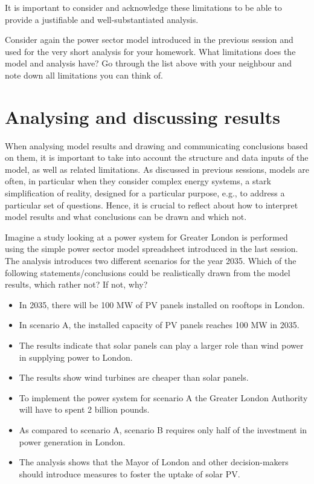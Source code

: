 It is important to consider and acknowledge these limitations to be able to provide a justifiable and well-substantiated analysis.


\begin{kaobox}[frametitle=Task]
Consider again the power sector model introduced in the previous session and used for the very short analysis for your homework. What limitations does the model and analysis have? Go through the list above with your neighbour and note down all limitations you can think of.
\end{kaobox}

\section{Analysing and discussing results}
When analysing model results and drawing and communicating conclusions based on them, it is important to take into account the structure and data inputs of the model, as well as related limitations. As discussed in previous sessions, models are often, in particular when they consider complex energy systems, a stark simplification of reality, designed for a particular purpose, e.g., to address a particular set of questions. Hence, it is crucial to reflect about how to interpret model results and what conclusions can be drawn and which not.


\begin{kaobox}[frametitle=Task]
Imagine a study looking at a power system for Greater London is performed using the simple power sector model spreadsheet introduced in the last session. The analysis introduces two different scenarios for the year 2035. Which of the following statements/conclusions could be realistically drawn from the model results, which rather not? If not, why?

\begin{itemize}
\item In 2035, there will be 100 MW of PV panels installed on rooftops in London.
\item In scenario A, the installed capacity of PV panels reaches 100 MW in 2035.

\item The results indicate that solar panels can play a larger role than wind power in supplying power to London.
\item The results show wind turbines are cheaper than solar panels.

\item To implement the power system for scenario A the Greater London Authority will have to spent 2 billion pounds.
\item As compared to scenario A, scenario B requires only half of the investment in power generation in London.

\item The analysis shows that the Mayor of London and other decision-makers should introduce measures to foster the uptake of solar PV.
\end{itemize}

\end{kaobox}




